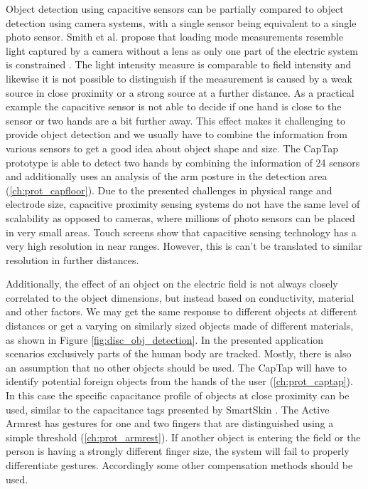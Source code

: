 Object detection using capacitive sensors can be partially compared to object detection using camera systems, with a single sensor being equivalent to a single photo sensor. Smith et al. propose that loading mode measurements resemble light captured by a camera without a lens as only one part of the electric system is constrained \cite{smith1998electric}. The light intensity measure is comparable to field intensity and likewise it is not possible to distinguish if the measurement is caused by a weak source in close proximity or a strong source at a further distance. As a practical example the capacitive sensor is not able to decide if one hand is close to the sensor or two hands are a bit further away. This effect makes it challenging to provide object detection and we usually have to combine the information from various sensors to get a good idea about object shape and size. The CapTap prototype is able to detect two hands by combining the information of 24 sensors and additionally uses an analysis of the arm posture in the detection area (\ref{ch:prot_capfloor}). Due to the presented challenges in physical range and electrode size, capacitive proximity sensing systems do not have the same level of scalability as opposed to cameras, where millions of photo sensors can be placed in very small areas. Touch screens show that capacitive sensing technology has a very high resolution in near ranges. However, this is can't be translated to similar resolution in further distances.

Additionally, the effect of an object on the electric field is not always closely correlated to the object dimensions, but instead based on conductivity, material and other factors. We may get the same response to different objects at different distances or get a varying on similarly sized objects made of different materials, as shown in Figure \ref{fig:disc_obj_detection}. In the presented application scenarios exclusively parts of the human body are tracked. Mostly, there is also an assumption that no other objects should be used. The CapTap will have to identify potential foreign objects from the hands of the user (\ref{ch:prot_captap}). In this case the specific capacitance profile of objects at close proximity can be used, similar to the capacitance tags presented by SmartSkin \cite{rekimoto2002smartskin}. The Active Armrest has gestures for one and two fingers that are distinguished using a simple threshold (\ref{ch:prot_armrest}). If another object is entering the field or the person is having a strongly different finger size, the system will fail to properly differentiate gestures. Accordingly some other compensation methods should be used.

